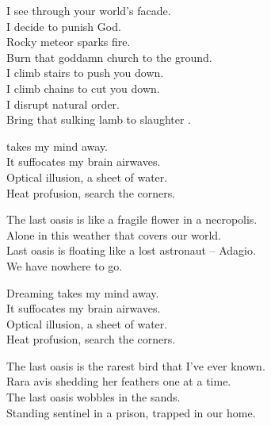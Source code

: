 I see through your world's facade. \\
I decide to punish God. \\
Rocky meteor sparks fire. \\
Burn that goddamn church to the ground. \\

I climb stairs to push you down. \\
I climb chains to cut you down. \\
I disrupt natural order. \\
Bring that sulking lamb to slaughter . \\





 takes my mind away. \\
It suffocates my brain airwaves. \\

Optical illusion, a sheet of water. \\
Heat profusion, search the corners. \\


The last oasis is like a fragile flower in a necropolis. \\
Alone in this weather that covers our world. \\
Last oasis is floating like a lost astronaut -- Adagio. \\
We have nowhere to go. \\


Dreaming takes my mind away. \\
It suffocates my brain airwaves. \\

Optical illusion, a sheet of water. \\
Heat profusion, search the corners. \\


The last oasis is the rarest bird that I've ever known. \\
Rara avis shedding her feathers one at a time. \\
The last oasis wobbles in the  sands. \\
Standing sentinel in a prison, trapped in our home. \\

